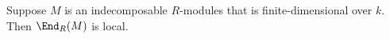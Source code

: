 Suppose $M$ is an indecomposable $R$-modules that is finite-dimensional over
$k$. Then $\End_R(M)$ is local.
